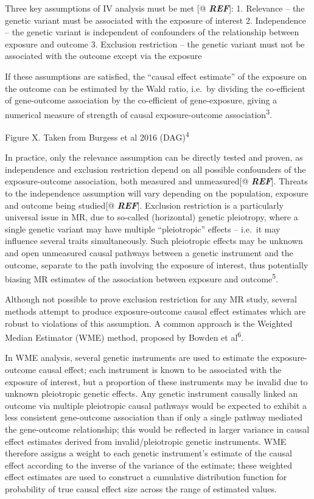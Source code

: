 \documentclass[
]{article}
\begin{document}
Three key assumptions of IV analysis must be met {[}@ \textbf{\emph{REF}}{]}:
1. Relevance -- the genetic variant must be associated with the exposure of interest
2. Independence -- the genetic variant is independent of confounders of the relationship between exposure and outcome
3. Exclusion restriction -- the genetic variant must not be associated with the outcome except via the exposure

If these assumptions are satisfied, the ``causal effect estimate'' of the exposure on the outcome can be estimated by the Wald ratio, i.e.~by dividing the co-efficient of gene-outcome association by the co-efficient of gene-exposure, giving a numerical measure of strength of causal exposure-outcome association\textsuperscript{3}.

Figure X. Taken from Burgess et al 2016 (DAG)\textsuperscript{4}

In practice, only the relevance assumption can be directly tested and proven, as independence and exclusion restriction depend on all possible confounders of the exposure-outcome association, both measured and unmeasured{[}@ \textbf{\emph{REF}}{]}. Threats to the independence assumption will vary depending on the population, exposure and outcome being studied{[}@ \textbf{\emph{REF}}{]}. Exclusion restriction is a particularly universal issue in MR, due to so-called (horizontal) genetic pleiotropy, where a single genetic variant may have multiple ``pleiotropic'' effects -- i.e.~it may influence several traits simultaneously. Such pleiotropic effects may be unknown and open unmeasured causal pathways between a genetic instrument and the outcome, separate to the path involving the exposure of interest, thus potentially biasing MR estimates of the association between exposure and outcome\textsuperscript{5}.

Although not possible to prove exclusion restriction for any MR study, several methods attempt to produce exposure-outcome causal effect estimates which are robust to violations of this assumption. A common approach is the Weighted Median Estimator (WME) method, proposed by Bowden et al\textsuperscript{6}.

In WME analysis, several genetic instruments are used to estimate the exposure-outcome causal effect; each instrument is known to be associated with the exposure of interest, but a proportion of these instruments may be invalid due to unknown pleiotropic genetic effects. Any genetic instrument causally linked an outcome via multiple pleiotropic causal pathways would be expected to exhibit a less consistent gene-outcome association than if only a single pathway mediated the gene-outcome relationship; this would be reflected in larger variance in causal effect estimates derived from invalid/pleiotropic genetic instruments. WME therefore assigns a weight to each genetic instrument's estimate of the causal effect according to the inverse of the variance of the estimate; these weighted effect estimates are used to construct a cumulative distribution function for probability of true causal effect size across the range of estimated values.
\end{document}
